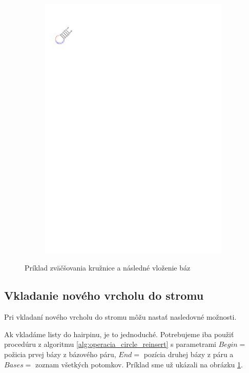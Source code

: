 \begin{figure}
\begin{subfigure}{\wi}
    \includegraphics[trim=1cm 24.5cm 17.5cm 2.5cm]{../img/alg/insert/1/circle-big-end}
  \end{subfigure}

  \caption{Príklad zväčšovania kružnice a následné vloženie báz}
  \label{obr:insert_circle_hairpin}
\end{figure}





\subsection{Vkladanie nového vrcholu do stromu}

Pri vkladaní nového vrcholu do stromu môžu nastať nasledovné možnosti.

Ak vkladáme listy do hairpinu, je to jednoduché. Potrebujeme iba použiť
procedúru z algoritmu \ref{alg:operacia_circle_reinsert}
s parametrami $Begin = $ požicia prvej bázy z bázového páru, $End = $ pozícia
druhej bázy z páru a $Bases = $ zoznam všetkých potomkov.
Príklad sme už ukázali na obrázku \ref{obr:insert_circle_hairpin}.

